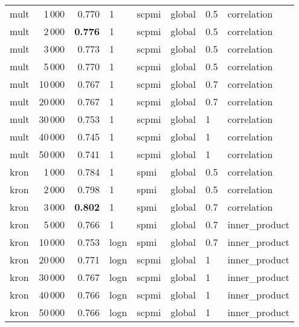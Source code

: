 \begin{tabular}{lrrlllll}
    mult &            1\,000 &  0.770 &     1 &  scpmi &  global &  0.5 &    correlation \\
    mult &            2\,000 &  \textbf{0.776} &     1 &  scpmi &  global &  0.5 &    correlation \\
    mult &            3\,000 &  0.773 &     1 &  scpmi &  global &  0.5 &    correlation \\
    mult &            5\,000 &  0.770 &     1 &  scpmi &  global &  0.5 &    correlation \\
    mult &           10\,000 &  0.767 &     1 &  scpmi &  global &  0.7 &    correlation \\
    mult &           20\,000 &  0.767 &     1 &  scpmi &  global &  0.7 &    correlation \\
    mult &           30\,000 &  0.753 &     1 &  scpmi &  global &    1 &    correlation \\
    mult &           40\,000 &  0.745 &     1 &  scpmi &  global &    1 &    correlation \\
    mult &           50\,000 &  0.741 &     1 &  scpmi &  global &    1 &    correlation \\ \addlinespace
    kron &            1\,000 &  0.784 &     1 &   spmi &  global &  0.5 &    correlation \\
    kron &            2\,000 &  0.798 &     1 &   spmi &  global &  0.5 &    correlation \\
    kron &            3\,000 &  \textbf{0.802} &     1 &   spmi &  global &  0.7 &    correlation \\
    kron &            5\,000 &  0.766 &     1 &   spmi &  global &  0.7 &  inner\_product \\
    kron &           10\,000 &  0.753 &  logn &   spmi &  global &  0.7 &  inner\_product \\
    kron &           20\,000 &  0.771 &  logn &  scpmi &  global &    1 &  inner\_product \\
    kron &           30\,000 &  0.767 &  logn &  scpmi &  global &    1 &  inner\_product \\
    kron &           40\,000 &  0.766 &  logn &  scpmi &  global &    1 &  inner\_product \\
    kron &           50\,000 &  0.766 &  logn &  scpmi &  global &    1 &  inner\_product \\
\bottomrule
\end{tabular}
